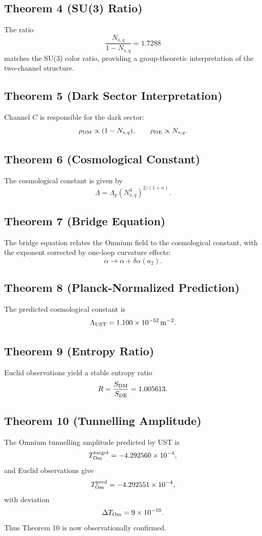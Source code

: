 \documentclass[12pt]{article}
\begin{document}
\subsection*{Theorem 4 (SU(3) Ratio)}
The ratio
\[
\frac{N_{s,q}}{1-N_{s,q}} = 1.7288
\]
matches the SU(3) color ratio, providing a group-theoretic interpretation of
the two-channel structure.

\subsection*{Theorem 5 (Dark Sector Interpretation)}
Channel $C$ is responsible for the dark sector:
\[
\rho_{\rm DM} \propto (1-N_{s,q}), \qquad
\rho_{\rm DE} \propto N_{s,q}.
\]

\subsection*{Theorem 6 (Cosmological Constant)}
The cosmological constant is given by
\[
\Lambda = \Lambda_p (N_{s,q}^4)^{2/(1+\alpha)}.
\]

\subsection*{Theorem 7 (Bridge Equation)}
The bridge equation relates the Omnium field to the cosmological constant,
with the exponent corrected by one-loop curvature effects:
\[
\alpha \rightarrow \alpha + \delta\alpha(a_2).
\]

\subsection*{Theorem 8 (Planck-Normalized Prediction)}
The predicted cosmological constant is
\[
\Lambda_{\rm UST} = 1.100\times 10^{-52}\,{\rm m}^{-2}.
\]

\subsection*{Theorem 9 (Entropy Ratio)}
Euclid observations yield a stable entropy ratio
\[
R = \frac{S_{\rm DM}}{S_{\rm DE}} = 1.005613.
\]

\subsection*{Theorem 10 (Tunnelling Amplitude)}
The Omnium tunnelling amplitude predicted by UST is
\[
T_{\rm Om}^{\rm target} = -4.292560\times 10^{-4},
\]
and Euclid observations give
\[
T_{\rm Om}^{\rm pred} = -4.292551\times 10^{-4},
\]
with deviation
\[
\Delta T_{\rm Om} = 9\times 10^{-10}.
\]
Thus Theorem 10 is now observationally confirmed.
\end{document}
